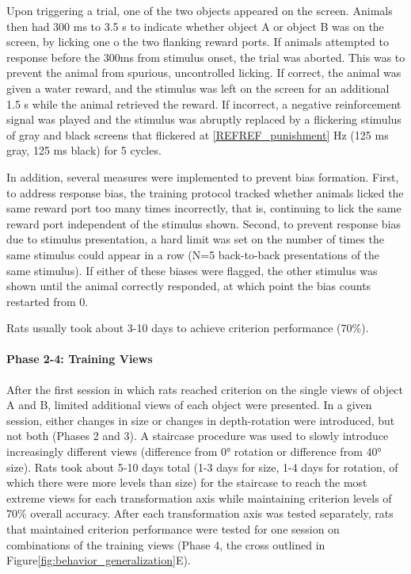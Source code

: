 Upon triggering a trial, one of the two objects appeared on the screen. Animals then had 300 ms to 3.5 s to indicate whether object A or object B was on the screen, by licking one o the two flanking reward ports. If animals attempted to response before the 300ms from stimulus onset, the trial was aborted. This was to prevent the animal from spurious, uncontrolled licking. If correct, the animal was given a water reward, and the stimulus was left on the screen for an additional 1.5 s while the animal retrieved the reward. If incorrect, a negative reinforcement signal was played and the stimulus was abruptly replaced by a flickering stimulus of gray and black screens that flickered at \ref{REFREF_punishment}  Hz (125 ms gray, 125 ms black) for 5 cycles. 

In addition, several measures were implemented to prevent bias formation. First, to address response bias, the training protocol tracked whether animals licked the same reward port too many times incorrectly, that is, continuing to lick the same reward port independent of the stimulus shown. Second, to prevent response bias due to stimulus presentation, a hard limit was set on the number of times the same stimulus could appear in a row (N=5 back-to-back presentations of the same stimulus). If either of these biases were flagged, the other stimulus was shown until the animal correctly responded, at which point the bias counts restarted from 0.

Rats usually took about 3-10 days to achieve criterion performance (70\%).  

\paragraph{Phase 2-4: Training Views}
After the first session in which rats reached criterion on the single views of object A and B, limited additional views of each object were presented. In a given session, either changes in size or changes in depth-rotation were introduced, but not both (Phases 2 and 3). A staircase procedure was used to slowly introduce increasingly different views (difference from \ang{0} rotation or difference from \ang{40} size). Rats took about 5-10 days total (1-3 days for size, 1-4 days for rotation, of which there were more levels than size) for the staircase to reach the most extreme views for each transformation axis while maintaining criterion levels of 70\% overall accuracy. After each transformation axis was tested separately, rats that maintained criterion performance were tested for one session on combinations of the training views (Phase 4, the cross outlined in Figure\ref{fig:behavior_generalization}E). 

